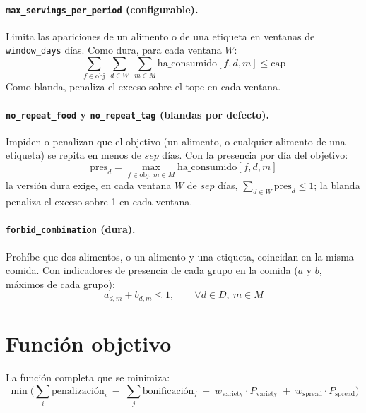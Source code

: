 \paragraph{\texttt{max\_servings\_per\_period} (configurable).} Limita las apariciones de un alimento o de una etiqueta en ventanas de \texttt{window\_days} días. Como dura, para cada ventana $W$:
\begin{equation*}
\sum_{f \in \text{obj}}\ \sum_{d \in W}\ \sum_{m \in M} \text{ha\_consumido}[f,d,m] \le \text{cap}
\end{equation*}
Como blanda, penaliza el exceso sobre el tope en cada ventana.

\paragraph{\texttt{no\_repeat\_food} y \texttt{no\_repeat\_tag} (blandas por defecto).} Impiden o penalizan que el objetivo (un alimento, o cualquier alimento de una etiqueta) se repita en menos de $sep$ días. Con la presencia por día del objetivo:
\begin{equation*}
\text{pres}_d = \max_{f \in \text{obj},\, m \in M} \text{ha\_consumido}[f,d,m]
\end{equation*}
la versión dura exige, en cada ventana $W$ de $sep$ días, $\sum_{d \in W} \text{pres}_d \le 1$; la blanda penaliza el exceso sobre 1 en cada ventana.

\paragraph{\texttt{forbid\_combination} (dura).} Prohíbe que dos alimentos, o un alimento y una etiqueta, coincidan en la misma comida. Con indicadores de presencia de cada grupo en la comida ($a$ y $b$, máximos de cada grupo):
\begin{equation*}
a_{d,m} + b_{d,m} \le 1, \qquad \forall d \in D,\ m \in M
\end{equation*}

\section{Función objetivo}
\label{sec:anexoObjetivo}

La función completa que se minimiza:
\begin{equation*}
\min \Big( \sum_{i} \text{penalización}_i \;-\; \sum_{j} \text{bonificación}_j \;+\; w_{\text{variety}} \cdot P_{\text{variety}} \;+\; w_{\text{spread}} \cdot P_{\text{spread}} \Big)
\end{equation*}

